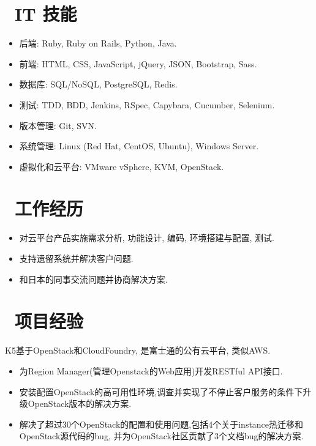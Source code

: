 \documentclass{resume}
\begin{document}



\section{\faCogs\ IT 技能}
\begin{itemize}[parsep=0.5ex]
  \item 后端: Ruby, Ruby on Rails, Python, Java.
  \item 前端: HTML, CSS, JavaScript, jQuery, JSON, Bootstrap, Sass.
  \item 数据库: SQL/NoSQL, PostgreSQL, Redis.
  \item 测试: TDD, BDD, Jenkins, RSpec, Capybara, Cucumber, Selenium.
  \item 版本管理: Git, SVN.
  \item 系统管理: Linux (Red Hat, CentOS, Ubuntu), Windows Server.
  \item 虚拟化和云平台: VMware vSphere, KVM, OpenStack.
\end{itemize}

\section{\faUsers\ 工作经历}
\begin{itemize}
  \item 对云平台产品实施需求分析, 功能设计, 编码, 环境搭建与配置, 测试.
  \item 支持遗留系统并解决客户问题.
  \item 和日本的同事交流问题并协商解决方案.
\end{itemize}

\section{\faTasks\ 项目经验}
\begin{onehalfspacing}
K5基于OpenStack和CloudFoundry, 是富士通的公有云平台, 类似AWS.
\begin{itemize}
  \item 为Region Manager(管理Openstack的Web应用)开发RESTful API接口.
  \item 安装配置OpenStack的高可用性环境,调查并实现了不停止客户服务的条件下升级OpenStack版本的解决方案.
  \item 解决了超过30个OpenStack的配置和使用问题,包括4个关于instance热迁移和OpenStack源代码的bug, 并为OpenStack社区贡献了3个文档bug的解决方案.
\end{itemize}
\end{onehalfspacing}
\end{document}
